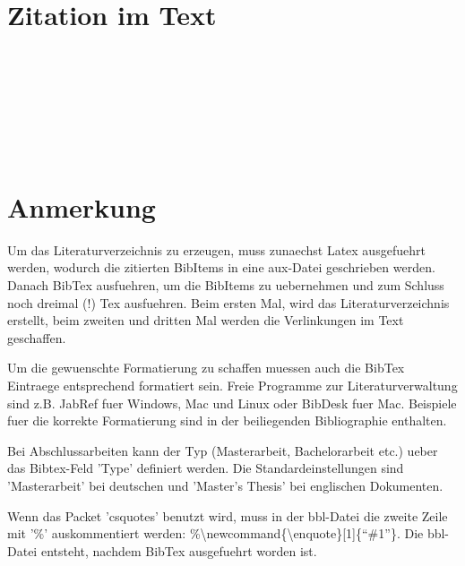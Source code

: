 \documentclass[12pt,oneside,a4paper]{scrartcl}	%
\begin{document}
\clearpage

\section{Zitation im Text}
\citet{Ahnert2008}\\
\citet[Fig.~5.1]{Ahnert2008}\\
\citep{Ahnert2008}\\
\citep[p.~200]{Ahnert2008}\\
\citep[c.f.][]{Ahnert2008}\\
\citep[c.f.][Fig.~5.1]{Ahnert2008}\\
\citep{Ahnert2008, Barron1971}


\section{Anmerkung}
Um das Literaturverzeichnis zu erzeugen, muss zunaechst Latex ausgefuehrt werden, wodurch die zitierten BibItems in eine aux-Datei geschrieben werden. Danach BibTex ausfuehren, um die BibItems zu uebernehmen und zum Schluss noch dreimal (!) Tex ausfuehren. Beim ersten Mal, wird das Literaturverzeichnis erstellt, beim zweiten und dritten Mal werden die Verlinkungen im Text geschaffen.

Um die gewuenschte Formatierung zu schaffen muessen auch die BibTex Eintraege entsprechend formatiert sein. Freie Programme zur Literaturverwaltung sind z.B. JabRef fuer Windows, Mac und Linux oder BibDesk fuer Mac. Beispiele fuer die korrekte Formatierung sind in der beiliegenden Bibliographie enthalten.

Bei Abschlussarbeiten kann der Typ (Masterarbeit, Bachelorarbeit etc.) ueber das Bibtex-Feld 'Type' definiert werden. Die Standardeinstellungen sind 'Masterarbeit' bei deutschen und 'Master's Thesis' bei englischen Dokumenten.

Wenn das Packet 'csquotes' benutzt wird, muss in der bbl-Datei die zweite Zeile mit '\%' auskommentiert werden: \%\textbackslash newcommand\{\textbackslash enquote\}[1]\{``\#1''\}. Die bbl-Datei entsteht, nachdem BibTex ausgefuehrt worden ist.


\end{document}
